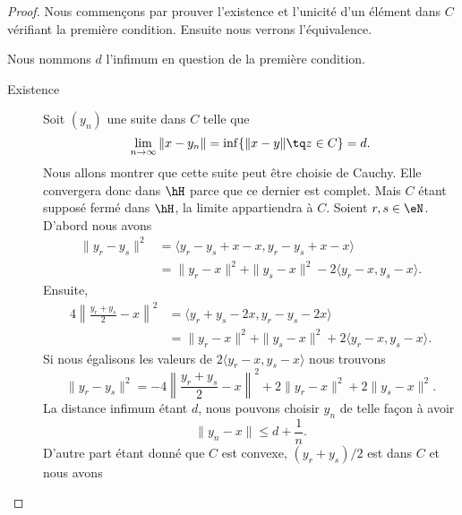 \begin{proof}
    Nous commençons par prouver l'existence et l'unicité d'un élément dans \( C\) vérifiant la première condition. Ensuite nous verrons l'équivalence. 
    
    Nous nommons \( d\) l'infimum en question de la première condition.
    \begin{description}
        \item[Existence] 
    Soit \( (y_n)\) une suite dans \( C\) telle que 
    \begin{equation}
        \lim_{n\to \infty} \| x-y_n \|=\inf\{ \| x-y \|\tq z\in C \}=d.
    \end{equation}
    Nous allons montrer que cette suite peut être choisie de Cauchy. Elle convergera donc dans \( \hH\) parce que ce dernier est complet. Mais \( C\) étant supposé fermé dans \( \hH\), la limite appartiendra à \( C\). Soient \( r,s\in \eN\). D'abord nous avons
    \begin{subequations}
        \begin{align}
            \| y_r-y_s \|^2&=\langle y_r-y_s+x-x, y_r-y_s+x-x\rangle \\
            &=\| y_r-x \|^2+\| y_s-x \|^2-2\langle y_r-x, y_s-x\rangle .
        \end{align}
    \end{subequations}
    Ensuite,
    \begin{subequations}
        \begin{align}
            4\left\| \frac{ y_r+y_s }{2}-x \right\|^2&=\langle y_r+y_s-2x, y_r-y_s-2x\rangle \\
            &=\| y_r-x \|^2+\| y_s-x \|^2+2\langle y_r-x, y_s-x\rangle .
        \end{align}
    \end{subequations}
    Si nous égalisons les valeurs de \( 2\langle y_r-x, y_s-x\rangle \) nous trouvons
    \begin{equation}    \label{EqiqCyUa}
        \| y_r-y_s \|^2=-4\left\| \frac{ y_r+y_s }{2}-x \right\|^2+2\| y_r-x \|^2+2\| y_s-x \|^2.
    \end{equation}
    La distance infimum étant \( d\), nous pouvons choisir \( y_n\) de telle façon à avoir 
    \begin{equation}
        \| y_n-x \|\leq d+\frac{1}{ n }.
    \end{equation}
    D'autre part étant donné que \( C\) est convexe, \( (y_r+y_s)/2\) est dans \( C\) et nous avons
    \begin{equation}

\end{equation}
\end{description}
\end{proof}
